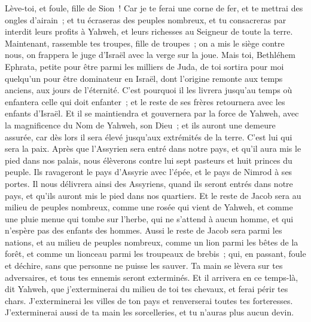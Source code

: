 \begin{multicols}{2}
Lève-toi, et foule, fille de Sion~! Car je te ferai une corne de fer, et te mettrai des ongles d'airain~; et tu écraseras des peuples nombreux, et tu consacreras par interdit leurs profits à Yahweh, et leurs richesses au Seigneur de toute la terre.
Maintenant, rassemble tes troupes, fille de troupes~; on a mis le siège contre nous, on frappera le juge d'Israël avec la verge sur la joue.
\VerseOne{}Mais toi, Bethléhem Ephrata, petite pour être parmi les milliers de Juda, de toi sortira pour moi quelqu'un pour être dominateur en Israël, dont l'origine remonte aux temps anciens, aux jours de l'éternité.
C'est pourquoi il les livrera jusqu'au temps où enfantera celle qui doit enfanter~; et le reste de ses frères retournera avec les enfants d'Israël.
Et il se maintiendra et gouvernera par la force de Yahweh, avec la magnificence du Nom de Yahweh, son Dieu~; et ils auront une demeure assurée, car dès lors il sera élevé jusqu'aux extrémités de la terre.
C'est lui qui sera la paix. Après que l'Assyrien sera entré dans notre pays, et qu'il aura mis le pied dans nos palais, nous élèverons contre lui sept pasteurs et huit princes du peuple.
Ils ravageront le pays d'Assyrie avec l'épée, et le pays de Nimrod à ses portes. Il nous délivrera ainsi des Assyriens, quand ils seront entrés dans notre pays, et qu'ils auront mis le pied dans nos quartiers.
Et le reste de Jacob sera au milieu de peuples nombreux, comme une rosée qui vient de Yahweh, et comme une pluie menue qui tombe sur l'herbe, qui ne s'attend à aucun homme, et qui n'espère pas des enfants des hommes.
Aussi le reste de Jacob sera parmi les nations, et au milieu de peuples nombreux, comme un lion parmi les bêtes de la forêt, et comme un lionceau parmi les troupeaux de brebis~; qui, en passant, foule et déchire, sans que personne ne puisse les sauver.
Ta main se lèvera sur tes adversaires, et tous tes ennemis seront exterminés.
Et il arrivera en ce temps-là, dit Yahweh, que j'exterminerai du milieu de toi tes chevaux, et ferai périr tes chars.
J'exterminerai les villes de ton pays et renverserai toutes tes forteresses.
J'exterminerai aussi de ta main les sorcelleries, et tu n'auras plus aucun devin.

\end{multicols}
